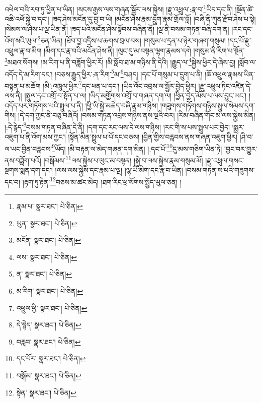 འཕེལ་བའི་རབ་ཏུ་ཕྱིན་པ་ཡིན། །སངས་རྒྱས་ལས་གཞན་སྦྱོར་ལས་སྐྱེས། །རྫུ་འཕྲུལ་:རྣ་བ་\footnote{རྣམ་པ་  སྣར་ཐང་།  པེ་ཅིན། }ཡིད་དང་ནི། །སྔོན་ཚེ་འཆི་འཕོ་སྐྱེ་བ་དང་། །ཟད་ཤེས་མངོན་དུ་བྱ་བ་ཡི། །མངོན་ཤེས་རྣམ་དྲུག་རྣམ་གྲོལ་བློ། །བཞི་ནི་ཀུན་རྫོབ་ཤེས་པ་སྟེ། །སེམས་ལ་ཤེས་པ་ལྔ་ཡིན་ནོ། །ཟད་པའི་མངོན་ཤེས་སྟོབས་བཞིན་ནོ། །ལྔ་ནི་བསམ་གཏན་བཞི་དག་ན། །རང་དང་འོག་སའི་ཡུལ་\footnote{ཡུན་  སྣར་ཐང་།  པེ་ཅིན། }ཅན་ཡིན། །ཐོབ་བྱ་འདྲིས་པ་ཆགས་བྲལ་བས། །གསུམ་པ་དྲན་པ་ཉེར་གཞག་གསུམ། །དང་པོ་རྫུ་འཕྲུལ་རྣ་བ་མིག །མིག་དང་རྣ་བའི་མངོན་ཤེས་ནི། །ལུང་དུ་མ་བསྟན་ལྷག་རྣམས་དགེ །གསུམ་ནི་རིག་པ་སྔོན་\footnote{མངོན་  སྣར་ཐང་།  པེ་ཅིན། }མཐའ་སོགས། །མ་རིག་པ་ནི་བཟློག་ཕྱིར་རོ། །མི་སློབ་ཐ་མ་གཉིས་ནི་དེའི། །རྒྱུད་ལ་\footnote{ལས་  སྣར་ཐང་།  པེ་ཅིན། }སྐྱེས་ཕྱིར་དེ་ཞེས་བྱ། །སློབ་ལ་འདོད་དེ་མ་རིག་དང་། །བཅས་རྒྱུད་ཕྱིར་:ན་རིག་\footnote{ན་  སྣར་ཐང་།  པེ་ཅིན། }མ་\footnote{མ་རིག་  སྣར་ཐང་།  པེ་ཅིན། }བཤད། །དང་པོ་གསུམ་པ་དྲུག་པ་ནི། །ཆོ་འཕྲུལ་རྣམས་ཡིན་བསྟན་པ་མཆོག །མི་:འཁྲུལ་ཕྱིར་\footnote{འཕྲུལ་ཕྱི་  སྣར་ཐང་།  པེ་ཅིན། }དང་ཕན་པ་དང་། །ཡིད་འོང་འབྲས་ལ་སྦྱོར་བྱེད་ཕྱིར། །རྫུ་འཕྲུལ་ཏིང་འཛིན་དེ་ལས་ནི། །སྤྲུལ་དང་འགྲོ་བ་སྟོན་པ་ལ། །ཡིད་མགྱོགས་འགྲོ་བ་གཞན་དག་ལ། །ཕྱིན་བྱེད་མོས་པ་ལས་བྱུང་ཡང་། །འདོད་པར་གཏོགས་པའི་སྤྲུལ་པ་ནི། །ཕྱི་ཡི་སྐྱེ་མཆེད་བཞི་རྣམ་གཉིས། །གཟུགས་གཏོགས་གཉིས་སྤྲུལ་སེམས་དག་གིས། །དེ་དག་ཀྱང་ནི་བཅུ་བཞིའོ། །བསམ་གཏན་འབྲས་གཉིས་ནས་ལྔའི་བར། །རིམ་བཞིན་གོང་མ་ལས་སྐྱེས་མིན། །:དེ་རྙེད་\footnote{དེ་སྙེད་  སྣར་ཐང་།  པེ་ཅིན། }བསམ་གཏན་བཞིན་དེ་ནི། །དག་དང་རང་ལས་དེ་ལས་གཉིས། །རང་གི་ས་པས་སྤྲུལ་པར་བྱེད། །སྨྲར་འཇུག་པ་ནི་འོག་མས་ཀྱང་། །སྟོན་མིན་སྤྲུལ་པ་པོ་དང་བཅས། །བྱིན་གྱིས་བརླབས་ནས་གཞན་འཇུག་ཕྱིར། །ཤི་བ་ལ་ཡང་བྱིན་བརླབས་\footnote{བརླབ་  སྣར་ཐང་།  པེ་ཅིན། }ཡོད། །མི་བརྟན་ལ་མེད་གཞན་དག་མིན། །:དང་པོ་\footnote{དང་པོར་  སྣར་ཐང་།  པེ་ཅིན། }དུ་མས་གཅིག་ཡིན་ཏེ། །བྱང་བར་གྱུར་ནས་བཟློག་པའོ། །བསྒོམས་\footnote{བསྒོམ་  སྣར་ཐང་།  པེ་ཅིན། }ལས་སྐྱེས་པ་ལུང་མ་བསྟན། །སྐྱེ་བ་ལས་སྐྱེས་རྣམ་གསུམ་མོ། །རྫུ་འཕྲུལ་གསང་སྔགས་སྨན་དག་དང་། །ལས་ལས་སྐྱེས་དང་རྣམ་པ་ལྔ། །ལྷ་ཡི་མིག་དང་རྣ་བ་ཡིན། །བསམ་གཏན་ས་པའི་གཟུགས་དང་བ། །རྟག་ཏུ་རྟེན་\footnote{སྟེན་  སྣར་ཐང་།  པེ་ཅིན། }བཅས་མ་ཚང་མེད། །ཐག་རིང་ཕྲ་སོགས་སྤྱོད་ཡུལ་ཅན། །

